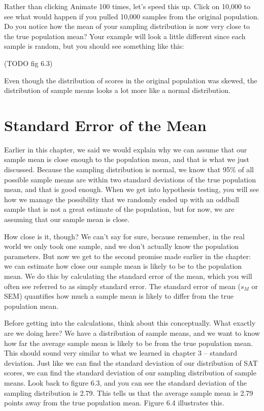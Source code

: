 \documentclass[
  letterpaper,
  DIV=11,
  numbers=noendperiod]{scrreprt}
\begin{document}
Rather than clicking Animate 100 times, let's speed this up. Click on
10,000 to see what would happen if you pulled 10,000 samples from the
original population. Do you notice how the mean of your sampling
distribution is now very close to the true population mean? Your example
will look a little different since each sample is random, but you should
see something like this:

(TODO fig 6.3)

Even though the distribution of scores in the original population was
skewed, the distribution of sample means looks a lot more like a normal
distribution.

\section{Standard Error of the Mean}\label{standard-error-of-the-mean}

Earlier in this chapter, we said we would explain why we can assume that
our sample mean is close enough to the population mean, and that is what
we just discussed. Because the sampling distribution is normal, we know
that 95\% of all possible sample means are within two standard
deviations of the true population mean, and that is good enough. When we
get into hypothesis testing, you will see how we manage the possibility
that we randomly ended up with an oddball sample that is not a great
estimate of the population, but for now, we are assuming that our sample
mean is close.

How close is it, though? We can't say for sure, because remember, in the
real world we only took one sample, and we don't actually know the
population parameters. But now we get to the second promise made earlier
in the chapter: we can estimate how close our sample mean is likely to
be to the population mean. We do this by calculating the standard error
of the mean, which you will often see referred to as simply standard
error. The standard error of mean (\(s_M\) or SEM) quantifies how much a
sample mean is likely to differ from the true population mean.

Before getting into the calculations, think about this conceptually.
What exactly are we doing here? We have a distribution of sample means,
and we want to know how far the average sample mean is likely to be from
the true population mean. This should sound very similar to what we
learned in chapter 3 -- standard deviation. Just like we can find the
standard deviation of our distribution of SAT scores, we can find the
standard deviation of our sampling distribution of sample means. Look
back to figure 6.3, and you can see the standard deviation of the
sampling distribution is 2.79. This tells us that the average sample
mean is 2.79 points away from the true population mean. Figure 6.4
illustrates this.
\end{document}

